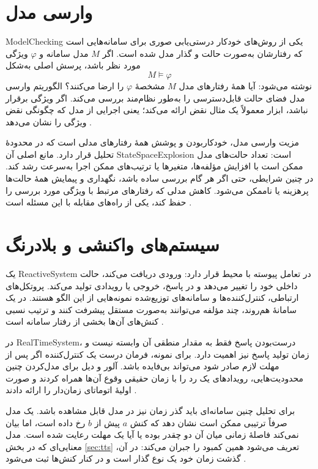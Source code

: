 \section{وارسی مدل}

\gls{ModelChecking} یکی از روش‌های خودکار درستی‌یابی صوری برای سامانه‌هایی است که رفتارشان به‌صورت حالت و گذار مدل شده است. اگر $M$ مدل سامانه و $\varphi$ ویژگی مورد نظر باشد، پرسش اصلی به‌شکل
\[
M \models \varphi
\]
نوشته می‌شود: آیا همهٔ رفتارهای مدل $M$ مشخصهٔ $\varphi$ را ارضا می‌کنند؟ الگوریتم وارسی مدل فضای حالت قابل‌دسترسی را به‌طور نظام‌مند بررسی می‌کند. اگر ویژگی برقرار نباشد، ابزار معمولاً یک مثال نقض ارائه می‌کند؛ یعنی اجرایی از مدل که چگونگی نقض ویژگی را نشان می‌دهد \cite{ClarkeGrumbergPeled1999,BaierKatoen2008}.

مزیت وارسی مدل، خودکاربودن و پوشش همهٔ رفتارهای مدلی است که در محدودهٔ تحلیل قرار دارد. مانع اصلی آن \gls{StateSpaceExplosion} است: تعداد حالت‌های مدل ممکن است با افزایش مؤلفه‌ها، متغیرها یا ترتیب‌های ممکن اجرا به‌سرعت رشد کند. در چنین شرایطی، حتی اگر هر گام بررسی ساده باشد، نگهداری و پیمایش همهٔ حالت‌ها پرهزینه یا ناممکن می‌شود. کاهش مدلی که رفتارهای مرتبط با ویژگی مورد بررسی را حفظ کند، یکی از راه‌های مقابله با این مسئله است \cite{ClarkeGrumbergPeled1999,Sirjani2004Thesis}.

\section{سیستم‌های واکنشی و بلادرنگ}

یک \gls{ReactiveSystem} در تعامل پیوسته با محیط قرار دارد: ورودی دریافت می‌کند، حالت داخلی خود را تغییر می‌دهد و در پاسخ، خروجی یا رویدادی تولید می‌کند. پروتکل‌های ارتباطی، کنترل‌کننده‌ها و سامانه‌های توزیع‌شده نمونه‌هایی از این الگو هستند. در یک سامانهٔ هم‌روند، چند مؤلفه می‌توانند به‌صورت مستقل پیشرفت کنند و ترتیب نسبی کنش‌های آن‌ها بخشی از رفتار سامانه است \cite{SirjaniEtAl2004Rebeca,Sirjani2004Thesis}.

در \gls{RealTimeSystem}، درست‌بودن پاسخ فقط به مقدار منطقی آن وابسته نیست و زمان تولید پاسخ نیز اهمیت دارد. برای نمونه، فرمان درست یک کنترل‌کننده اگر پس از مهلت لازم صادر شود می‌تواند بی‌فایده باشد. آلور و دیل برای مدل‌کردن چنین محدودیت‌هایی، رویدادهای یک رد را با زمان حقیقی وقوع آن‌ها همراه کردند و صورت اولیهٔ اتوماتای زمان‌دار را ارائه دادند \cite{AlurDill1990}.

برای تحلیل چنین سامانه‌ای باید گذر زمان نیز در مدل قابل مشاهده باشد. یک مدل صرفاً ترتیبی ممکن است نشان دهد که کنش $a$ پیش از $b$ رخ داده است، اما بیان نمی‌کند فاصلهٔ زمانی میان آن دو چقدر بوده یا آیا یک مهلت رعایت شده است. مدل معنایی‌ای که در بخش \ref{sec:tts} تعریف می‌شود همین کمبود را جبران می‌کند: در آن، گذشت زمان خود یک نوع گذار است و در کنار کنش‌ها ثبت می‌شود \cite{BerardEtAl2008}.

